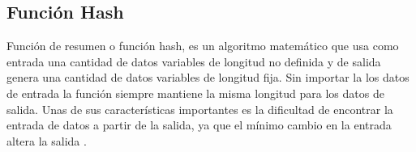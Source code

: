 \subsection{Función Hash}

Función de resumen o función hash, es un algoritmo matemático  que usa como entrada 
una cantidad de datos variables de longitud no definida y de salida genera una cantidad de 
datos variables de longitud fija. Sin importar la los datos de entrada  la función siempre mantiene 
la misma longitud para los datos de salida. Unas de sus características importantes es la dificultad de  encontrar
la entrada de datos a partir de la salida, ya que el mínimo cambio en la entrada altera la salida \cite[]{drescher_Blockchain_2017,joaquin_lopez_lerida_economiBlockchain_2016}.
